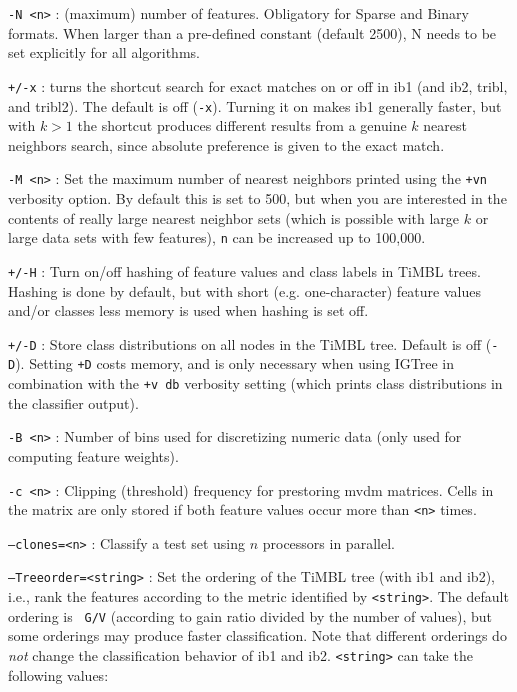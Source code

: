 \documentclass{book}
\begin{document}
\begin{description}

\item {\tt -N <n>} : (maximum) number of features. Obligatory for
  Sparse and Binary formats. When larger than a pre-defined constant
  (default 2500), N needs to be set explicitly for all algorithms.

\item {\tt +/-x} : turns the shortcut search for exact matches on or
  off in {\sc ib1} (and {\sc ib2}, {\sc tribl}, and {\sc tribl2}). The
  default is off ({\tt -x}). Turning it on makes {\sc ib1}
  generally faster, but with $k>1$ the shortcut produces different
  results from a genuine $k$ nearest neighbors search, since absolute
  preference is given to the exact match.

\item {\tt -M <n>} : Set the maximum number of nearest neighbors
  printed using the {\tt +vn} verbosity option. By default this is set
  to 500, but when you are interested in the contents of really large
  nearest neighbor sets (which is possible with large $k$ or large
  data sets with few features), {\tt n} can be increased up to
  100,000.

\item {\tt +/-H} : Turn on/off hashing of feature values and class
  labels in TiMBL trees. Hashing is done by default, but with short
  (e.g. one-character) feature values and/or classes less memory is
  used when hashing is set off.

\item {\tt +/-D} : Store class distributions on all nodes in the TiMBL
  tree. Default is off ({\tt -D}). Setting {\tt +D} costs memory, and
  is only necessary when using IGTree in combination with the {\tt +v
    db} verbosity setting (which prints class distributions in the
  classifier output).

\item {\tt -B <n>} : Number of bins used for discretizing numeric data
  (only used for computing feature weights).

\item {\tt -c <n>} : Clipping (threshold) frequency for prestoring
  {\sc mvdm} matrices. Cells in the matrix are only stored if both
  feature values occur more than {\tt <n>} times.

\item {\tt --clones=<n>} : Classify a test set using $n$ processors in
  parallel.

\item {\tt --Treeorder=<string>} : Set the ordering of the TiMBL tree (with
  {\sc ib1} and {\sc ib2}), i.e., rank the features according to the
  metric identified by {\tt <string>}. The default ordering is {\tt
    G/V} (according to gain ratio divided by the number of values),
  but some orderings may produce faster classification. Note that
  different orderings do {\em not}\/ change the classification
  behavior of {\sc ib1} and {\sc ib2}. {\tt <string>} can take the
  following values:


\end{description}
\end{document}
